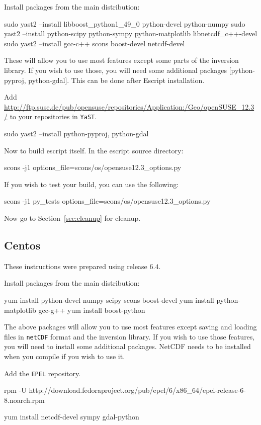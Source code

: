 \noindent Install packages from the main distribution:
\begin{shellCode}
sudo yast2 --install libboost_python1_49_0 python-devel python-numpy 
sudo yast2 --install python-scipy python-sympy python-matplotlib libnetcdf_c++-devel
sudo yast2 --install gcc-c++ scons boost-devel netcdf-devel
\end{shellCode}
These will allow you to use most features except some parts of the \downunder inversion library.
If you wish to use those, you will need some additional packages [python-pyproj, python-gdal].
This can be done after Escript installation.

\begin{optionalstep}
Add \url{http://ftp.suse.de/pub/opensuse/repositories/Application:/Geo/openSUSE_12.3/}
to your repositories in \texttt{YaST}.
\begin{shellCode}
sudo yast2 --install python-pyproj, python-gdal
\end{shellCode}
\end{optionalstep}

Now to build escript itself.
In the escript source directory:
\begin{shellCode}
scons -j1 options_file=scons/os/opensuse12.3_options.py
\end{shellCode}

\noindent If you wish to test your build, you can use the following:
\begin{shellCode}
scons -j1 py_tests options_file=scons/os/opensuse12.3_options.py 
\end{shellCode}

\noindent Now go to Section~\ref{sec:cleanup} for cleanup.

\subsection{Centos}\label{sec:centossrc}
These instructions were prepared using release $6.4$.

\noindent Install packages from the main distribution:
\begin{shellCode}
yum install python-devel numpy scipy scons boost-devel
yum install python-matplotlib gcc-g++
yum install boost-python 
\end{shellCode}

The above packages will allow you to use most features except saving and loading files in \texttt{netCDF} 
format and the \downunder inversion library.
If you wish to use those features, you will need to install some additional packages.
NetCDF needs to be installed when you compile if you wish to use it.
\begin{optionalstep}
\noindent Add the \texttt{EPEL} repository.
\begin{shellCode}
rpm -U http://download.fedoraproject.org/pub/epel/6/x86_64/epel-release-6-8.noarch.rpm
\end{shellCode}

\begin{shellCode}
yum install netcdf-devel sympy gdal-python
\end{shellCode}
\end{optionalstep}


